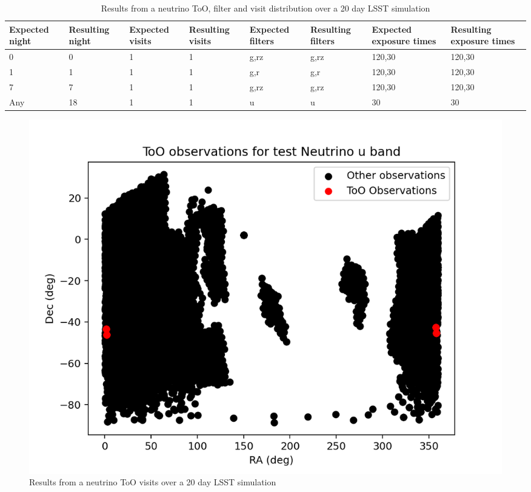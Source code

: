 \begin{table}[]
\centering
\begin{tabular}{|l|l|l|l|l|l|l|l|}
\hline
Expected night & Resulting night & Expected visits & Resulting visits & Expected filters & Resulting filters & Expected exposure times & Resulting exposure times \\ \hline
0              & 0               & 1               & 1                & g,rz             & g,rz              & 120,30                  & 120,30                   \\ \hline
1              & 1               & 1               & 1                & g,r              & g,r               & 120,30                  & 120,30                   \\ \hline
7              & 7               & 1               & 1                & g,rz             & g,rz              & 120,30                  & 120,30                   \\ \hline
Any            & 18              & 1               & 1                & u                & u                 & 30                      & 30                       \\ \hline
\end{tabular}
\caption{Results from a neutrino ToO, filter and visit distribution over a 20 day LSST simulation}
\label{tab:HENeutrinoResult}
\end{table}



\begin{figure}
    \centering
    \includegraphics[width=\linewidth]{figures/validationTests/SVRequired/NeutrinoPosition.png}
    \caption{Results from a neutrino ToO visits over a 20 day LSST simulation}
    \label{fig:NeutrinoPositionResult}
\end{figure}

